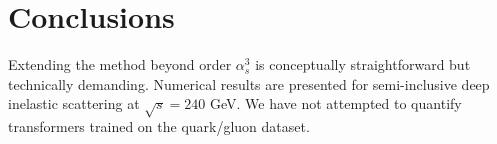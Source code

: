 \section{Conclusions}\label{sec:conclusions}

Extending the method beyond order $\alpha_s^3$ is conceptually
straightforward but technically demanding. Numerical results are
presented for semi-inclusive deep inelastic scattering at $\sqrt{s} =
240$ GeV. We have not attempted to quantify transformers trained on the
quark/gluon dataset.

